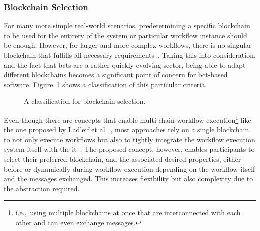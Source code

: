 \subsubsection{Blockchain Selection}
\label{sec:evaluation:qualitative_analysis:flexibility_criteria:blockchain_selection}
For many more simple real-world scenarios, predetermining a specific blockchain to be used for the entirety of the system or particular workflow instance should be enough. However, for larger and more complex workflows, there is no singular blockchain that fulfills all necessary requirements~\cite{architecture_for_multi_chain_bp_ladleif}. Taking this into consideration, and the fact that \glspl{bct} are a rather quickly evolving sector, being able to adapt different blockchains becomes a significant point of concern for \gls{bct}-based software. Figure~\ref{fig:evaluation:qualitative_analysis:blockchain_selection_classes} shows a classification of this particular criteria.

\begin{figure}[h]
    \caption{A classification for blockchain selection.}
    \label{fig:evaluation:qualitative_analysis:blockchain_selection_classes}
\end{figure}

Even though there are concepts that enable multi-chain workflow execution\footnote{i.e.,\ using multiple blockchains at once that are interconnected with each other and can even exchange messages.} like the one proposed by Ladleif et al.~\cite{architecture_for_multi_chain_bp_ladleif}, most approaches rely on a single blockchain to not only execute workflows but also to tightly integrate the workflow execution system itself with the it~\cite{untrusted_bp_execution_using_blockchain,runtime_verification_for_bp_utilizing_bitcoin,bo_collaboration_between_healthcare_providers_covid_19}. The proposed concept, however, enables participants to select their preferred blockchain, and the associated desired properties, either before or dynamically during workflow execution depending on the workflow itself and the messages exchanged. This increases flexibility but also complexity due to the abstraction required.

